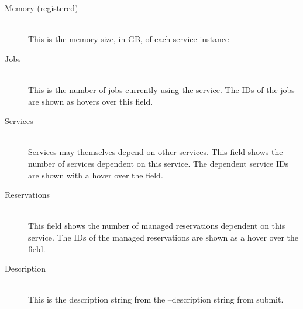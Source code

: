 \begin{description}
            \item[Memory (registered)] \hfill \\
              This is the memory size, in GB, of each service instance

            \item[Jobs] \hfill \\
              This is the number of jobs currently using the service.  The IDs of the jobs are
              shown as hovers over this field.

            \item[Services] \hfill \\
              Services may themselves depend on other services.  This field shows the number of
              services dependent on this service.  The dependent service IDs are shown with a 
              hover over the field.

            \item[Reservations] \hfill \\
              This field shows the number of
              managed reservations dependent on this service. The IDs of the managed reservations
              are shown as a hover over the field.

              
            \item[Description] \hfill \\
              This is the description string from the --description string from submit.
        \end{description}
